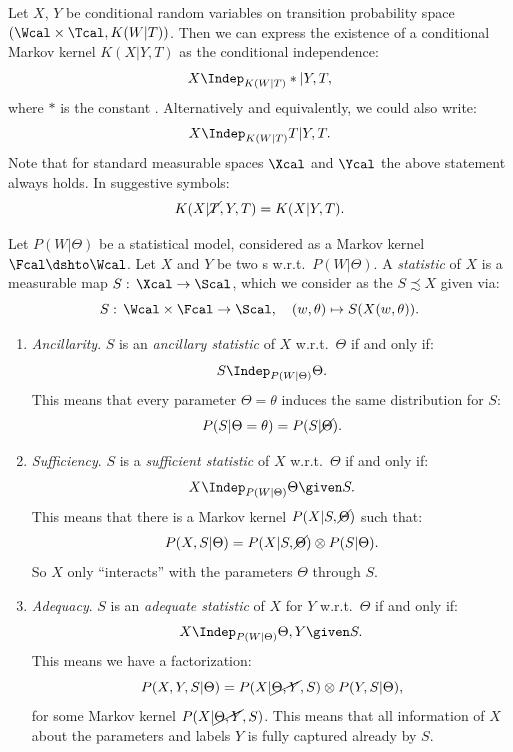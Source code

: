 \begin{Rem}
    \label{conditional-markov-kernel-as-ci}
    Let $X$, $Y$ be conditional random variables on transition probability space $(\Wcal \times \Tcal, K(W|T))$.
    Then we can express the existence of a conditional Markov kernel $K(X|Y,T)$ as the conditional independence:
    \[ X\Indep_{K(W|T)} \ast|Y,T,  \]
    where $\ast$ is the constant \trv{}. Alternatively and equivalently, we could also write:
    \[ X\Indep_{K(W|T)} T|Y,T.  \]
    Note that for standard measurable spaces $\Xcal$ and $\Ycal$ the above statement always holds.
    In suggestive symbols:
    \[ K(X|\cancel{T},Y,T) = K(X|Y,T). \]
\end{Rem}

\begin{Eg} Let $P(W|\Theta)$ be a statistical model, considered as a Markov kernel $\Fcal \dshto \Wcal$. Let $X$ and $Y$ be two \trv{}s w.r.t.\ $P(W|\Theta)$.
    A \emph{statistic} of $X$ is a measurable map $S:\,\Xcal \to \Scal$, which we consider as the  \trv{} $S\precsim X$ given via:
    \[ S:\,\Wcal \times \Fcal \to \Scal,\quad (w,\theta) \mapsto S(X(w,\theta)). \]
\begin{enumerate}
\item \emph{Ancillarity}. $S$ is an \emph{ancillary statistic} of $X$ w.r.t.\ $\Theta$ if and only if:
\[ S \Indep_{P(W|\Theta)} \Theta.\]
This means that every parameter $\Theta=\theta$ induces the same distribution for $S$: 
\[P(S|\Theta=\theta) = P(S|\cancel{\Theta}).\]
\item \emph{Sufficiency}. $S$ is a \emph{sufficient statistic} of $X$ w.r.t.\ $\Theta$ if and only if:
\[ X \Indep_{P(W|\Theta)} \Theta \given S.\]
This means that there is a Markov kernel $P(X|S,\cancel{\Theta})$ such that:
\[ P(X,S|\Theta) = P(X|S,\cancel{\Theta}) \otimes P(S|\Theta).\]
So $X$ only ``interacts'' with the parameters $\Theta$ through $S$.
\item \emph{Adequacy}. $S$ is an \emph{adequate statistic} of $X$ for $Y$ w.r.t.\ $\Theta$ if and only if:
\[ X \Indep_{P(W|\Theta)} \Theta,Y \given S.\]
This means we have a factorization:
\[ P(X,Y,S|\Theta) = P(X|\cancel{\Theta,Y},S) \otimes P(Y,S|\Theta),\]
for some Markov kernel $P(X|\cancel{\Theta,Y},S)$.
This means that all information of $X$ about the parameters and labels $Y$ is fully captured already by $S$.
\end{enumerate}
\end{Eg}

